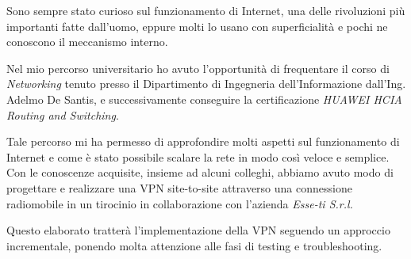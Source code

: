 \begin{flushleft}
\begin{comment}
Il lettore deve capire dal sommario l'ambito di applicazione del progetto svolto, la problematica esaminata, i metodi e gli algoritmi utilizzati per realizzare il progetto e risolvere gli eventuali problemi incontrati, i risultati ottenuti.

Dalla lettura del sommario il lettore deve comprendere se, per i suoi scopi, può essere utile proseguire o meno la lettura, ovvero se gli argomenti descritti rispondono alle sue necessità. Pensiamo, ad esempio, si pensi a un lettore che sia un laureando che si trova ad affrontare un progetto su temi o ambiti di applicazione collegati: vale la pena leggere questo elaborato?



\end{comment}


\begin{comment}

scaletta
prima parte
  sempre stato curioso su come funziona internet
  è un sistema complesso eppure lo usano tutti senza sapere cos'è
  fatto la certificazione HUAWEI per que
seconda parte
  in sto coso ci concentrimao sull'implementazione della vpn
  con vari test del funzionamento e bla bla


\end{comment}

Sono sempre stato curioso sul funzionamento di Internet, una delle rivoluzioni più importanti fatte dall'uomo, eppure molti lo usano con superficialità e pochi ne conoscono il meccanismo interno. 

Nel mio percorso universitario ho avuto l'opportunità di frequentare il corso di \textit{Networking} tenuto presso il Dipartimento di Ingegneria dell’Informazione dall’Ing. Adelmo De Santis, e successivamente conseguire la certificazione \textit{HUAWEI HCIA Routing and Switching}. 

Tale percorso mi ha permesso di approfondire molti aspetti sul funzionamento di Internet e come è stato possibile scalare la rete in modo così veloce e semplice. Con le conoscenze acquisite, insieme ad alcuni colleghi, abbiamo avuto modo di progettare e realizzare una VPN site-to-site attraverso una connessione radiomobile in un tirocinio in collaborazione con l'azienda \textit{Esse-ti S.r.l.}

Questo elaborato tratterà l'implementazione della VPN seguendo un approccio incrementale, ponendo molta attenzione alle fasi di testing e troubleshooting.





\end{flushleft}



\vfill
\newpage